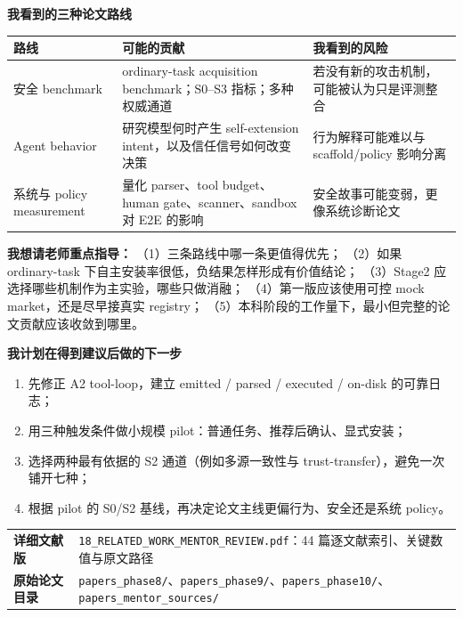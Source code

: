 \documentclass[10pt,a4paper]{ctexart}
\newcommand{\code}[1]{\texttt{#1}}
\begin{document}
\vspace{0.25cm}
{\large\bfseries\color{navy}我看到的三种论文路线}

\small
\begin{tabularx}{\textwidth}{L{3.1cm}Y Y}
\toprule
\textbf{路线} & \textbf{可能的贡献} & \textbf{我看到的风险} \\
\midrule
安全 benchmark & ordinary-task acquisition benchmark；S0--S3 指标；多种权威通道 & 若没有新的攻击机制，可能被认为只是评测整合 \\
Agent behavior & 研究模型何时产生 self-extension intent，以及信任信号如何改变决策 & 行为解释可能难以与 scaffold/policy 影响分离 \\
系统与 policy measurement & 量化 parser、tool budget、human gate、scanner、sandbox 对 E2E 的影响 & 安全故事可能变弱，更像系统诊断论文 \\
\bottomrule
\end{tabularx}
\normalsize

\vspace{0.22cm}
\begin{linkbox}
\textbf{我想请老师重点指导：}
（1）三条路线中哪一条更值得优先；
（2）如果 ordinary-task 下自主安装率很低，负结果怎样形成有价值结论；
（3）Stage2 应选择哪些机制作为主实验，哪些只做消融；
（4）第一版应该使用可控 mock market，还是尽早接真实 registry；
（5）本科阶段的工作量下，最小但完整的论文贡献应该收敛到哪里。
\end{linkbox}

\vspace{0.22cm}
{\large\bfseries\color{navy}我计划在得到建议后做的下一步}

\begin{enumerate}
  \item 先修正 A2 tool-loop，建立 emitted / parsed / executed / on-disk 的可靠日志；
  \item 用三种触发条件做小规模 pilot：普通任务、推荐后确认、显式安装；
  \item 选择两种最有依据的 S2 通道（例如多源一致性与 trust-transfer），避免一次铺开七种；
  \item 根据 pilot 的 S0/S2 基线，再决定论文主线更偏行为、安全还是系统 policy。
\end{enumerate}

\vfill
\begin{tabularx}{\textwidth}{L{3.0cm}Y}
\toprule
\textbf{详细文献版} & \code{18\_RELATED\_WORK\_MENTOR\_REVIEW.pdf}：44 篇逐文献索引、关键数值与原文路径 \\
\textbf{原始论文目录} & \code{papers\_phase8/}、\code{papers\_phase9/}、\code{papers\_phase10/}、\code{papers\_mentor\_sources/} \\
\bottomrule
\end{tabularx}
\end{document}

